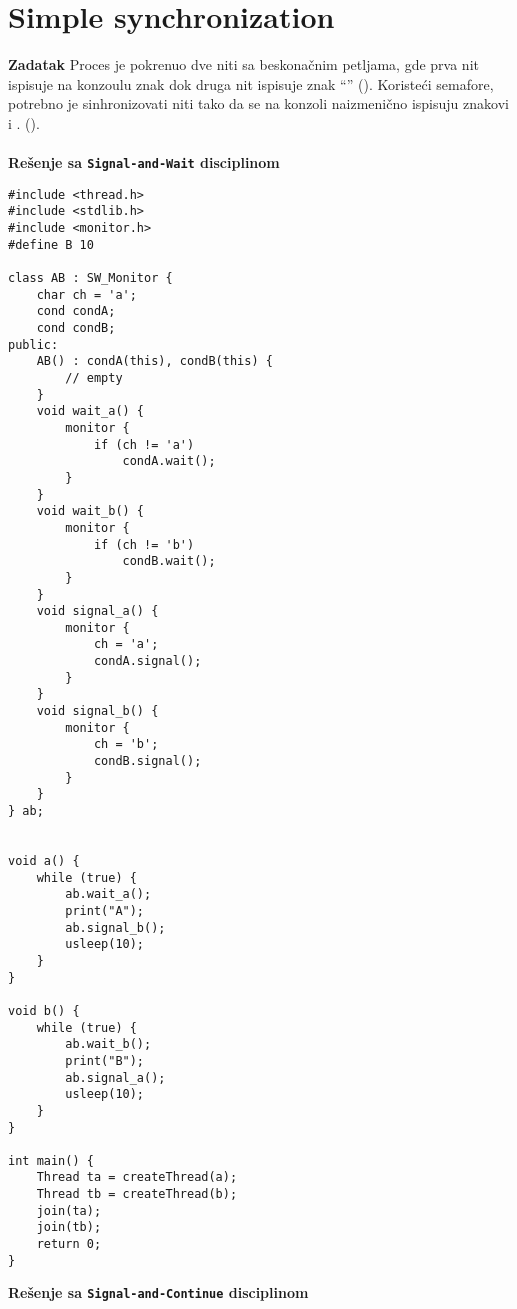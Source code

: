 \clearpage
\section{\latin Simple synchronization}
\textbf{\large Zadatak} Proces je pokrenuo dve niti sa beskona\v{c}nim petljama, gde prva nit ispisuje na konzoulu znak  dok druga nit ispisuje znak ``'' (). Koriste\'{c}i semafore, potrebno je sinhronizovati niti tako da se na konzoli naizmeni\v{c}no ispisuju znakovi  i . ().
\\\\
\textbf{Re\v{s}enje sa \texttt{Signal-and-Wait} disciplinom}
\begin{lstlisting}
#include <thread.h>
#include <stdlib.h>
#include <monitor.h>
#define B 10

class AB : SW_Monitor {
    char ch = 'a';
    cond condA;
    cond condB;
public:
    AB() : condA(this), condB(this) {
        // empty
    }
    void wait_a() {
        monitor {
            if (ch != 'a')
                condA.wait();
        }
    }
    void wait_b() {
        monitor {
            if (ch != 'b')
                condB.wait();
        }
    }
    void signal_a() {
        monitor {
            ch = 'a';
            condA.signal();
        }
    }
    void signal_b() {
        monitor {
            ch = 'b';
            condB.signal();
        }
    }
} ab;


void a() {
    while (true) {
        ab.wait_a();
        print("A");
        ab.signal_b();
        usleep(10);
    }
}

void b() {
    while (true) {
        ab.wait_b();
        print("B");
        ab.signal_a();
        usleep(10);
    }
}

int main() {
    Thread ta = createThread(a);
    Thread tb = createThread(b);
    join(ta);
    join(tb);
    return 0;
}

\end{lstlisting}
\textbf{Re\v{s}enje sa \texttt{Signal-and-Continue} disciplinom}
